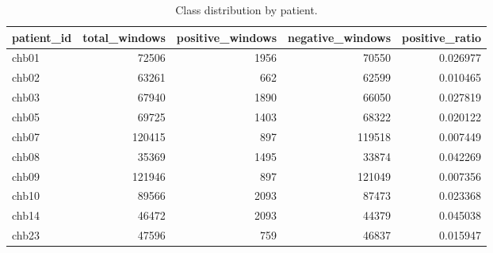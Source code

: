\begin{table}
\caption{Class distribution by patient.}
\label{tab:class_distribution_table}
\begin{tabular}{lrrrr}
\toprule
patient\_id & total\_windows & positive\_windows & negative\_windows & positive\_ratio \\
\midrule
chb01 & 72506 & 1956 & 70550 & 0.026977 \\
chb02 & 63261 & 662 & 62599 & 0.010465 \\
chb03 & 67940 & 1890 & 66050 & 0.027819 \\
chb05 & 69725 & 1403 & 68322 & 0.020122 \\
chb07 & 120415 & 897 & 119518 & 0.007449 \\
chb08 & 35369 & 1495 & 33874 & 0.042269 \\
chb09 & 121946 & 897 & 121049 & 0.007356 \\
chb10 & 89566 & 2093 & 87473 & 0.023368 \\
chb14 & 46472 & 2093 & 44379 & 0.045038 \\
chb23 & 47596 & 759 & 46837 & 0.015947 \\
\bottomrule
\end{tabular}
\end{table}
